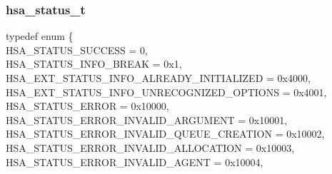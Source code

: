 \documentclass[final,oneside]{book}
\newcommand{\reftyp}[1]{#1}
\newcommand{\refenu}[1]{\reftyp{#1}}
\newenvironment{mylongtable}{\rowcolors{0}{lightgray}{lightgray}\longtable} {
\endlongtable}
\begin{document}
\subsubsection{hsa_\-status_\-t}
\vspace{-5.5mm}\begin{mylongtable}{@{}p{\textwidth}}
\rule{0pt}{3ex}typedef enum \{\\\hspace{1.7em}\hypertarget{group__status_1ggad755322e7ff95456520e8abdbe90d225ae382ea0c9c05cce5a60d0317375159cc}{\refenu{HSA_\-STATUS_\-SUCCESS}} = 0,\\
\hspace{1.7em}\hypertarget{group__status_1ggad755322e7ff95456520e8abdbe90d225a86c476121ca787ff75f6a4676507b221}{\refenu{HSA_\-STATUS_\-INFO_\-BREAK}} = 0x1,\\
\hspace{1.7em}\hypertarget{group__status_1ggad755322e7ff95456520e8abdbe90d225a0882e3ebb9cc8a5c6033c43ee7a6d898}{\refenu{HSA_\-EXT_\-STATUS_\-INFO_\-ALREADY_\-INITIALIZED}} = 0x4000,\\
\hspace{1.7em}\hypertarget{group__status_1ggad755322e7ff95456520e8abdbe90d225a60343279bea68766b037297915b5f903}{\refenu{HSA_\-EXT_\-STATUS_\-INFO_\-UNRECOGNIZED_\-OPTIONS}} = 0x4001,\\
\hspace{1.7em}\hypertarget{group__status_1ggad755322e7ff95456520e8abdbe90d225a60edf4d82e4703ff750ea38d619fea88}{\refenu{HSA_\-STATUS_\-ERROR}} = 0x10000,\\
\hspace{1.7em}\hypertarget{group__status_1ggad755322e7ff95456520e8abdbe90d225ac7d3651f75107d2a6a8ba3b25683c030}{\refenu{HSA_\-STATUS_\-ERROR_\-INVALID_\-ARGUMENT}} = 0x10001,\\
\hspace{1.7em}\hypertarget{group__status_1ggad755322e7ff95456520e8abdbe90d225a7b27f50e23a776b496b8b4707f21ccad}{\refenu{HSA_\-STATUS_\-ERROR_\-INVALID_\-QUEUE_\-CREATION}} = 0x10002,\\
\hspace{1.7em}\hypertarget{group__status_1ggad755322e7ff95456520e8abdbe90d225ac818189ff640d38ce13558e72daddb75}{\refenu{HSA_\-STATUS_\-ERROR_\-INVALID_\-ALLOCATION}} = 0x10003,\\
\hspace{1.7em}\hypertarget{group__status_1ggad755322e7ff95456520e8abdbe90d225a3a5d835c109c2d0ad5b9c2771e133e5d}{\refenu{HSA_\-STATUS_\-ERROR_\-INVALID_\-AGENT}} = 0x10004,\\

\end{mylongtable}
\end{document}
